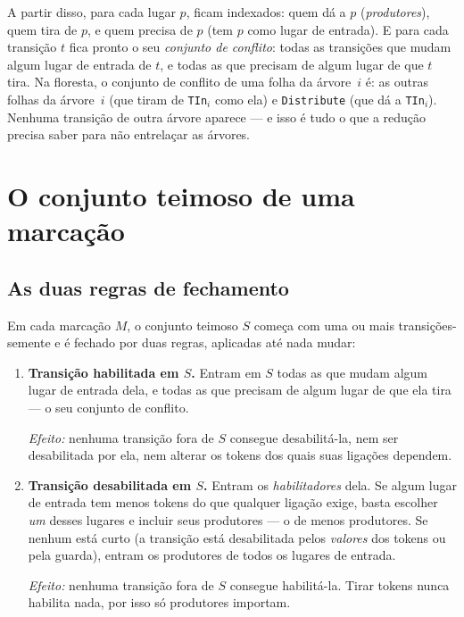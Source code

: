 \documentclass[11pt,a4paper]{report}
\newcommand{\code}[1]{\texttt{\small #1}}
\theoremstyle{definition}
\begin{document}
A partir disso, para cada lugar $p$, ficam indexados: quem dá a $p$
(\emph{produtores}), quem tira de $p$, e quem precisa de $p$ (tem $p$ como
lugar de entrada). E para cada transição $t$ fica pronto o seu \emph{conjunto
de conflito}: todas as transições que mudam algum lugar de entrada de $t$, e
todas as que precisam de algum lugar de que $t$ tira. Na floresta, o conjunto
de conflito de uma folha da árvore~$i$ é: as outras folhas da árvore~$i$ (que
tiram de \code{TIn}$_i$ como ela) e \code{Distribute} (que dá a
\code{TIn}$_i$). Nenhuma transição de outra árvore aparece --- e isso é tudo o
que a redução precisa saber para não entrelaçar as árvores.

\chapter{O conjunto teimoso de uma marcação}
\label{cap:teimoso}

\section{As duas regras de fechamento}

Em cada marcação $M$, o conjunto teimoso $S$ começa com uma ou mais
transições-semente e é fechado por duas regras, aplicadas até nada mudar:

\begin{enumerate}[leftmargin=1.6em]
  \item \textbf{Transição habilitada em $S$.} Entram em $S$ todas as que
        mudam algum lugar de entrada dela, e todas as que precisam de algum
        lugar de que ela tira --- o seu conjunto de conflito.

        \emph{Efeito:} nenhuma transição fora de $S$ consegue desabilitá-la,
        nem ser desabilitada por ela, nem alterar os tokens dos quais suas
        ligações dependem.
  \item \textbf{Transição desabilitada em $S$.} Entram os \emph{habilitadores}
        dela. Se algum lugar de entrada tem menos tokens do que qualquer
        ligação exige, basta escolher \emph{um} desses lugares e incluir seus
        produtores --- o de menos produtores. Se nenhum está curto (a transição
        está desabilitada pelos \emph{valores} dos tokens ou pela guarda),
        entram os produtores de todos os lugares de entrada.

        \emph{Efeito:} nenhuma transição fora de $S$ consegue habilitá-la.
        Tirar tokens nunca habilita nada, por isso só produtores importam.
\end{enumerate}
\end{document}
